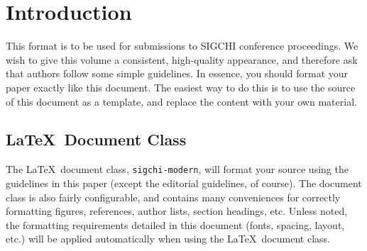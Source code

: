 \documentclass[preprint]{../latex/sigchi-modern}
\begin{document}
\maketitle

\begin{abstract}
This paper describes the formatting requirements for SIGCHI Conference
Proceedings and a few recommendations on writing for the worldwide SIGCHI
readership. It is also the documentation for the \LaTeX\ class
for producing formatted papers.
(This paper is not produced by SIGCHI, nor is it an authoritative source for
the described formatting.)
\end{abstract}



\section{Introduction}
This format is to be used for submissions to SIGCHI conference proceedings. We
wish to give this volume a consistent, high-quality appearance, and therefore
ask that authors follow some simple guidelines. In essence, you should format
your paper exactly like this document. The easiest way to do this is to use the
source of this document as a template, and replace the content with your own
material.

\subsection{\LaTeX\ Document Class}
The \LaTeX\ document class, \texttt{sigchi-modern}, will format your source
using the guidelines in this paper (except the editorial guidelines, of course).
The document class is also fairly configurable, and contains many conveniences
for correctly formatting figures, references, author lists, section headings,
etc. Unless noted, the formatting requirements detailed in this document (fonts,
spacing, layout, etc.) will be applied automatically when using the \LaTeX\ 
document class.
\end{document}
